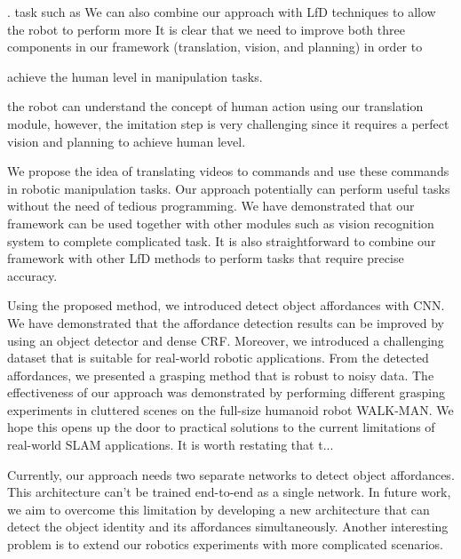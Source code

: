 \junk
{

 . task such as  We can also combine our approach with LfD techniques to allow the robot to perform more   It is clear that we need to improve both three components in our framework (translation, vision, and planning) in order to 
 
 
achieve the human level in manipulation tasks.



the robot can understand the concept of human action using our translation module, however, the imitation step is very challenging since it requires a perfect vision and planning to achieve human level. 



We propose the idea of translating videos to commands and use these commands in robotic manipulation tasks. Our approach potentially can perform useful tasks without the need of tedious programming. We have demonstrated that our framework can be used together with other modules such as vision recognition system to complete complicated task. It is also straightforward to combine our framework with other LfD methods to perform tasks that require precise accuracy.

 Using the proposed method, we introduced  detect object affordances with CNN. We have demonstrated that the affordance detection results can be improved by using an object detector and dense CRF. Moreover, we introduced a challenging dataset that is suitable for real-world robotic applications. From the detected affordances, we presented a grasping method that is robust to noisy data. The effectiveness of our approach was demonstrated by performing different grasping experiments in cluttered scenes on the full-size humanoid robot WALK-MAN. We hope this opens up the door to practical solutions to the current limitations of real-world SLAM applications. It is worth restating that t...
 
 


Currently, our approach needs two separate networks to detect object affordances. This architecture can't be trained end-to-end as a single network. In future work, we aim to overcome this limitation by developing a new architecture that can detect the object identity and its affordances simultaneously. Another interesting problem is to extend our robotics experiments with more complicated scenarios.
}